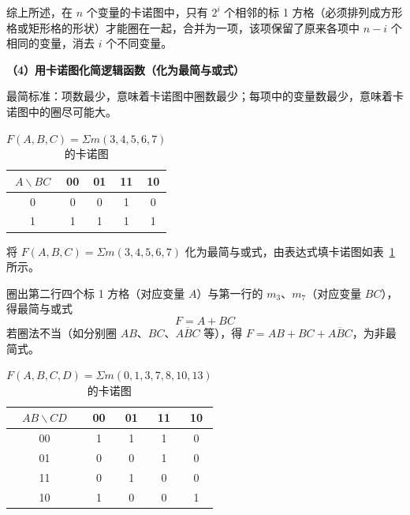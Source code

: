 综上所述，在 $n$ 个变量的卡诺图中，只有 $2^i$ 个相邻的标 1 方格（必须排列成方形格或矩形格的形状）才能圈在一起，合并为一项，该项保留了原来各项中 $n-i$ 个相同的变量，消去 $i$ 个不同变量。

\textbf{（4）用卡诺图化简逻辑函数（化为最简与或式）}

最简标准：项数最少，意味着卡诺图中圈数最少；每项中的变量数最少，意味着卡诺图中的圈尽可能大。

\begin{table}[H]
\centering
\caption{$F(A,B,C)=\Sigma m(3,4,5,6,7)$ 的卡诺图}
\label{tab:卡诺图:例1}
\begin{tabular}{c|cccc}
	\toprule
	$A\backslash BC$ & 00 & 01 & 11 & 10 \\
	\midrule
	0 & 0 & 0 & 1 & 0 \\
	1 & 1 & 1 & 1 & 1 \\
	\bottomrule
\end{tabular}
\end{table}

\begin{example}[用卡诺图化简逻辑函数]
\label{ex:卡诺图化简1}
将 $F(A,B,C)=\Sigma m(3,4,5,6,7)$ 化为最简与或式，由表达式填卡诺图如表~\ref{tab:卡诺图:例1}所示。

\begin{solution}
	圈出第二行四个标 1 方格（对应变量 $A$）与第一行的 $m_3$、$m_7$（对应变量 $BC$），得最简与或式
	\begin{equation}
		F=A+BC
		\label{eq:卡诺图:例1结果}
	\end{equation}
	若圈法不当（如分别圈 $AB$、$BC$、$A\overline{B}C$ 等），得 $F=AB+BC+A\overline{B}C$，为非最简式。
\end{solution}
\end{example}

\begin{table}[H]
\centering
\caption{$F(A,B,C,D)=\Sigma m(0,1,3,7,8,10,13)$ 的卡诺图}
\label{tab:卡诺图:例2}
\begin{tabular}{c|cccc}
	\toprule
	$AB\backslash CD$ & 00 & 01 & 11 & 10 \\
	\midrule
	00 & 1 & 1 & 1 & 0 \\
	01 & 0 & 0 & 1 & 0 \\
	11 & 0 & 1 & 0 & 0 \\
	10 & 1 & 0 & 0 & 1 \\
	\bottomrule
\end{tabular}
\end{table}

